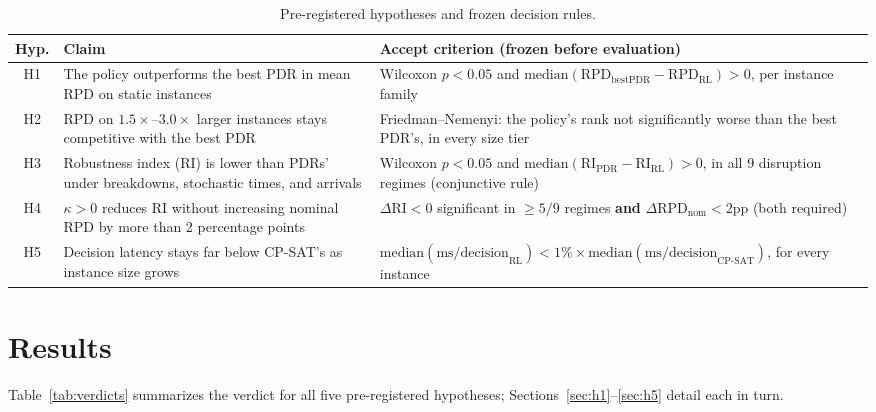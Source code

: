 \documentclass[11pt]{article}
\newcommand{\RPD}{\mathrm{RPD}}
\newcommand{\RI}{\mathrm{RI}}
\begin{document}
\begin{table}[htbp]
\centering
\caption{Pre-registered hypotheses and frozen decision rules.}
\label{tab:hypotheses}
\small
\begin{tabular}{cp{4.6cm}p{6.4cm}}
\toprule
\textbf{Hyp.} & \textbf{Claim} & \textbf{Accept criterion (frozen before evaluation)} \\
\midrule
H1 & The policy outperforms the best PDR in mean RPD on static instances &
Wilcoxon $p<0.05$ and $\text{median}(\RPD_{\text{bestPDR}} - \RPD_{\text{RL}}) > 0$, per instance family \\
\addlinespace
H2 & RPD on $1.5\times$--$3.0\times$ larger instances stays competitive with the best PDR &
Friedman--Nemenyi: the policy's rank not significantly worse than the best PDR's, in every size tier \\
\addlinespace
H3 & Robustness index (RI) is lower than PDRs' under breakdowns, stochastic times, and arrivals &
Wilcoxon $p<0.05$ and $\text{median}(\RI_{\text{PDR}} - \RI_{\text{RL}}) > 0$, in all 9 disruption regimes (conjunctive rule) \\
\addlinespace
H4 & $\kappa>0$ reduces RI without increasing nominal RPD by more than 2 percentage points &
$\Delta \RI<0$ significant in $\ge 5/9$ regimes \textbf{and} $\Delta \RPD_{\text{nom}} < 2$pp (both required) \\
\addlinespace
H5 & Decision latency stays far below CP-SAT's as instance size grows &
$\text{median}(\text{ms/decision}_{\text{RL}}) < 1\% \times \text{median}(\text{ms/decision}_{\text{CP-SAT}})$, for every instance \\
\bottomrule
\end{tabular}
\end{table}

\section{Results}
\label{sec:results}

Table~\ref{tab:verdicts} summarizes the verdict for all five pre-registered hypotheses; Sections~\ref{sec:h1}--\ref{sec:h5} detail each in turn.
\end{document}
